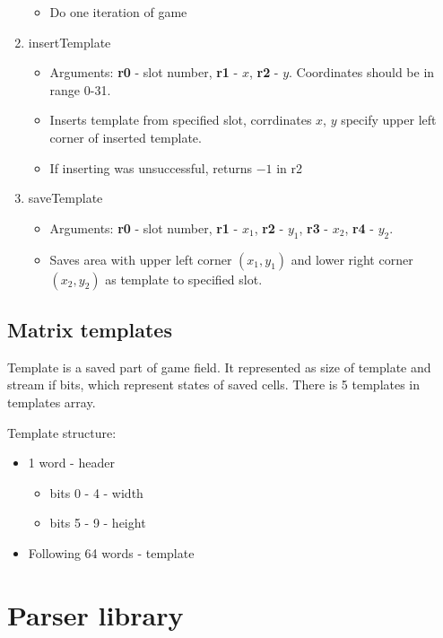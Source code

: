 \begin{enumerate}
\begin{itemize}
			\item Do one iteration of game
		\end{itemize}
	\item insertTemplate
		\begin{itemize}
			\item Arguments: \textbf{r0} - slot number, \textbf{r1} - $x$, \textbf{r2} - $y$. Coordinates should be in range 0-31.
			\item Inserts template from specified slot, corrdinates $x$, $y$ specify upper left corner of inserted template.
			\item If inserting was unsuccessful, returns $-1$ in r2
		\end{itemize}
	\item saveTemplate
		\begin{itemize}
			\item Arguments: \textbf{r0} - slot number, \textbf{r1} - $x_{1}$, \textbf{r2} - $y_{1}$, \textbf{r3} - $x_{2}$, \textbf{r4} - $y_{2}$.
			\item Saves area with upper left corner $(x_{1}, y_{1})$ and lower right corner $(x_{2}, y_{2})$ as template to specified slot.
		\end{itemize}
\end{enumerate}

\subsection*{Matrix templates}

Template is a saved part of game field. It represented as size of template and stream if bits, which represent states of saved cells. There is 5 templates in templates array.

Template structure:

\begin{itemize}
	\item 1 word - header
		\begin{itemize}
			\item bits 0 - 4 - width
			\item bits 5 - 9 - height
		\end{itemize}
	\item Following 64 words - template
\end{itemize}

\section*{Parser library}

